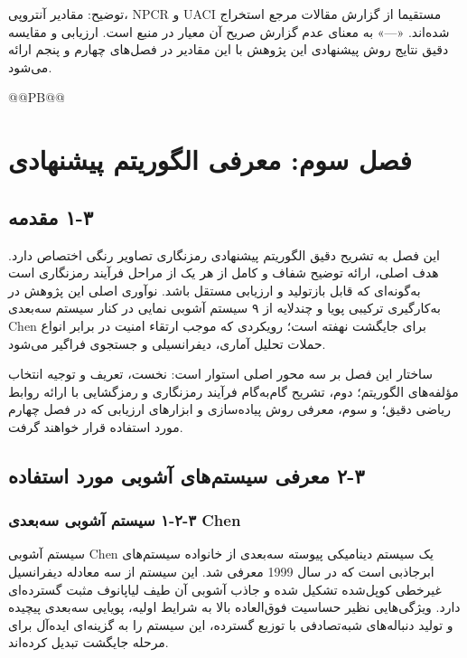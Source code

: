 توضیح: مقادیر آنتروپی، NPCR و UACI مستقیما از گزارش مقالات مرجع استخراج شده‌اند. «---» به معنای عدم گزارش صریح آن معیار در منبع است. ارزیابی و مقایسه دقیق نتایج روش پیشنهادی این پژوهش با این مقادیر در فصل‌های چهارم و پنجم ارائه می‌شود.


@@PB@@



\chapter{فصل سوم: معرفی الگوریتم پیشنهادی}
\section{‏۳‏-‏۱‏ مقدمه}

این فصل به تشریح دقیق الگوریتم پیشنهادی رمزنگاری تصاویر رنگی اختصاص دارد. هدف اصلی، ارائه توضیح شفاف و کامل از هر یک از مراحل فرآیند رمزنگاری است به‌گونه‌ای که قابل بازتولید و ارزیابی مستقل باشد. نوآوری اصلی این پژوهش در به‌کارگیری ترکیبی پویا و چندلایه از ۹ سیستم آشوبی نمایی در کنار سیستم سه‌بعدی Chen برای جایگشت نهفته است؛ رویکردی که موجب ارتقاء امنیت در برابر انواع حملات تحلیل آماری، دیفرانسیلی و جستجوی فراگیر می‌شود.

ساختار این فصل بر سه محور اصلی استوار است: نخست، تعریف و توجیه انتخاب مؤلفه‌های الگوریتم؛ دوم، تشریح گام‌به‌گام فرآیند رمزنگاری و رمزگشایی با ارائه روابط ریاضی دقیق؛ و سوم، معرفی روش پیاده‌سازی و ابزارهای ارزیابی که در فصل چهارم مورد استفاده قرار خواهند گرفت.

\section{‏۳‏-‏۲‏ معرفی سیستم‌های آشوبی مورد استفاده}

\subsection{‏۳‏-‏۲‏-‏۱‏ سیستم آشوبی سه‌بعدی Chen}

سیستم آشوبی Chen  \cite{ref6} یک سیستم دینامیکی پیوسته سه‌بعدی از خانواده سیستم‌های ابرجاذبی است که در سال 1999 معرفی شد. این سیستم از سه معادله دیفرانسیل غیرخطی کوپل‌شده تشکیل شده و جاذب آشوبی آن طیف لیاپانوف مثبت گسترده‌ای دارد. ویژگی‌هایی نظیر حساسیت فوق‌العاده بالا به شرایط اولیه، پویایی سه‌بعدی پیچیده و تولید دنباله‌های شبه‌تصادفی با توزیع گسترده، این سیستم را به گزینه‌ای ایده‌آل برای مرحله جایگشت تبدیل کرده‌اند.


